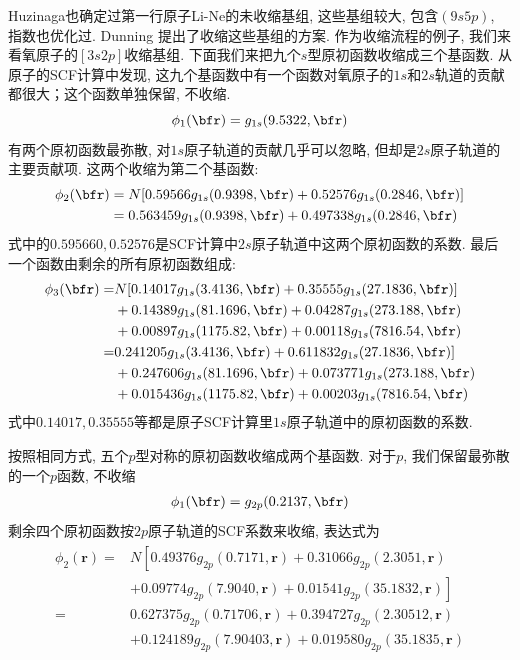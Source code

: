 Huzinaga也确定过第一行原子Li-Ne的未收缩基组, 这些基组较大, 包含$(9s5p)$, 指数也优化过. 
Dunning  提出了收缩这些基组的方案. 作为收缩流程的例子, 我们来看氧原子的$[3s2p]$收缩基组. 
下面我们来把九个$s$型原初函数收缩成三个基函数. 
从原子的SCF计算中发现, 这九个基函数中有一个函数对氧原子的$1s$和$2s$轨道的贡献都很大；这个函数单独保留, 不收缩.
\begin{equation}
	\label{3.290}
	\phi_1(\bfr)=g_{1s}(9.5322,\bfr)
\end{equation} 
有两个原初函数最弥散, 
对$1s$原子轨道的贡献几乎可以忽略, 
但却是$2s$原子轨道的主要贡献项. 
这两个收缩为第二个基函数:
\begin{align}
	\label{3.291}
	\phi_2(\bfr) & = N[0.59566g_{1s}(0.9398,\bfr) + 0.52576 g_{1s}(0.2846,\bfr)]\notag\\
	& = 0.563459 g_{1s}(0.9398,\bfr) + 0.497338 g_{1s}(0.2846,\bfr)
\end{align}
式中的$0.595660,0.52576$是SCF计算中$2s$原子轨道中这两个原初函数的系数.  
最后一个函数由剩余的所有原初函数组成:
\begin{align}
	\phi_3(\bfr) = & N[0.14017g_{1s}(3.4136,\bfr) + 0.35555g_{1s}(27.1836,\bfr)] \notag    \\
	& + 0.14389g_{1s}(81.1696,\bfr) + 0.04287 g_{1s}(273.188,\bfr) \notag   \\
	& + 0.00897g_{1s}(1175.82,\bfr) + 0.00118g_{1s}(7816.54,\bfr) \notag    \\
	= & 0.241205g_{1s}(3.4136,\bfr) + 0.611832g_{1s}(27.1836,\bfr)] \notag    \\
	& + 0.247606g_{1s}(81.1696,\bfr) + 0.073771 g_{1s}(273.188,\bfr) \notag \\
	& + 0.015436g_{1s}(1175.82,\bfr) + 0.00203g_{1s}(7816.54,\bfr)
\end{align}
式中$0.14017, 0.35555$等都是原子SCF计算里$1s$原子轨道中的原初函数的系数.


按照相同方式, 
五个$p$型对称的原初函数收缩成两个基函数. 
对于$p$, 我们保留最弥散的一个$p$函数, 不收缩
\begin{align}
	\phi_1(\bfr) = g_{2p}(0.2137,\bfr)
\end{align}
剩余四个原初函数按$2p$原子轨道的SCF系数来收缩, 
表达式为
\begin{align}
	\begin{aligned}
		\phi_{2}(\mathbf{r})= & N\left[0.49376 g_{2 p}(0.7171, \mathbf{r})+0.31066 g_{2 p}(2.3051, \mathbf{r})\right.  \\
		& \left.+0.09774 g_{2 p}(7.9040, \mathbf{r})+0.01541 g_{2 p}(35.1832, \mathbf{r})\right] \\
		= & 0.627375 g_{2 p}(0.71706, \mathbf{r})+0.394727 g_{2 p}(2.30512, \mathbf{r})            \\
		& +0.124189 g_{2 p}(7.90403, \mathbf{r})+0.019580 g_{2 p}(35.1835, \mathbf{r})
	\end{aligned}
\end{align}

